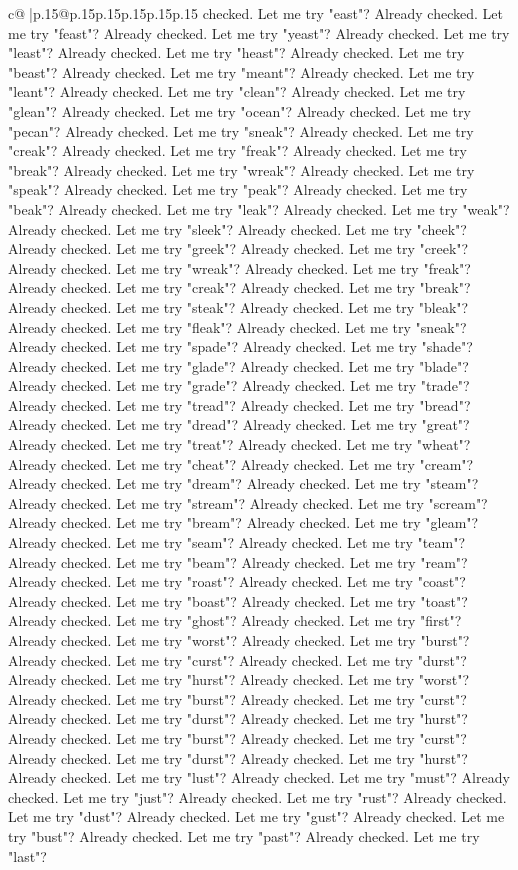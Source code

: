 \documentclass{article}
\begin{document}
{\begin{supertabular}{c@{$\;$}|p{.15\linewidth}@{}p{.15\linewidth}p{.15\linewidth}p{.15\linewidth}p{.15\linewidth}p{.15\linewidth}}
{{{checked. Let me try "east"? Already checked. Let me try "feast"? Already checked. Let me try "yeast"? Already checked. Let me try "least"? Already checked. Let me try "heast"? Already checked. Let me try "beast"? Already checked. Let me try "meant"? Already checked. Let me try "leant"? Already checked. Let me try "clean"? Already checked. Let me try "glean"? Already checked. Let me try "ocean"? Already checked. Let me try "pecan"? Already checked. Let me try "sneak"? Already checked. Let me try "creak"? Already checked. Let me try "freak"? Already checked. Let me try "break"? Already checked. Let me try "wreak"? Already checked. Let me try "speak"? Already checked. Let me try "peak"? Already checked. Let me try "beak"? Already checked. Let me try "leak"? Already checked. Let me try "weak"? Already checked. Let me try "sleek"? Already checked. Let me try "cheek"? Already checked. Let me try "greek"? Already checked. Let me try "creek"? Already checked. Let me try "wreak"? Already checked. Let me try "freak"? Already checked. Let me try "creak"? Already checked. Let me try "break"? Already checked. Let me try "steak"? Already checked. Let me try "bleak"? Already checked. Let me try "fleak"? Already checked. Let me try "sneak"? Already checked. Let me try "spade"? Already checked. Let me try "shade"? Already checked. Let me try "glade"? Already checked. Let me try "blade"? Already checked. Let me try "grade"? Already checked. Let me try "trade"? Already checked. Let me try "tread"? Already checked. Let me try "bread"? Already checked. Let me try "dread"? Already checked. Let me try "great"? Already checked. Let me try "treat"? Already checked. Let me try "wheat"? Already checked. Let me try "cheat"? Already checked. Let me try "cream"? Already checked. Let me try "dream"? Already checked. Let me try "steam"? Already checked. Let me try "stream"? Already checked. Let me try "scream"? Already checked. Let me try "bream"? Already checked. Let me try "gleam"? Already checked. Let me try "seam"? Already checked. Let me try "team"? Already checked. Let me try "beam"? Already checked. Let me try "ream"? Already checked. Let me try "roast"? Already checked. Let me try "coast"? Already checked. Let me try "boast"? Already checked. Let me try "toast"? Already checked. Let me try "ghost"? Already checked. Let me try "first"? Already checked. Let me try "worst"? Already checked. Let me try "burst"? Already checked. Let me try "curst"? Already checked. Let me try "durst"? Already checked. Let me try "hurst"? Already checked. Let me try "worst"? Already checked. Let me try "burst"? Already checked. Let me try "curst"? Already checked. Let me try "durst"? Already checked. Let me try "hurst"? Already checked. Let me try "burst"? Already checked. Let me try "curst"? Already checked. Let me try "durst"? Already checked. Let me try "hurst"? Already checked. Let me try "lust"? Already checked. Let me try "must"? Already checked. Let me try "just"? Already checked. Let me try "rust"? Already checked. Let me try "dust"? Already checked. Let me try "gust"? Already checked. Let me try "bust"? Already checked. Let me try "past"? Already checked. Let me try "last"? }}}
\end{supertabular}}
\end{document}
